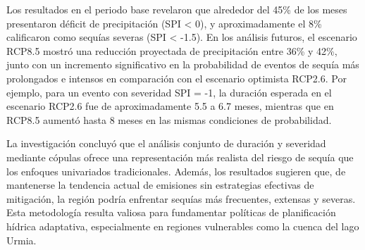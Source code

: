 Los resultados en el periodo base revelaron que alrededor del 45\% de los meses presentaron déficit de precipitación (SPI < 0), y aproximadamente el 8\% calificaron como sequías severas (SPI < -1.5). En los análisis futuros, el escenario RCP8.5 mostró una reducción proyectada de precipitación entre 36\% y 42\%, junto con un incremento significativo en la probabilidad de eventos de sequía más prolongados e intensos en comparación con el escenario optimista RCP2.6. Por ejemplo, para un evento con severidad SPI = -1, la duración esperada en el escenario RCP2.6 fue de aproximadamente 5.5 a 6.7 meses, mientras que en RCP8.5 aumentó hasta 8 meses en las mismas condiciones de probabilidad.

La investigación concluyó que el análisis conjunto de duración y severidad mediante cópulas ofrece una representación más realista del riesgo de sequía que los enfoques univariados tradicionales. Además, los resultados sugieren que, de mantenerse la tendencia actual de emisiones sin estrategias efectivas de mitigación, la región podría enfrentar sequías más frecuentes, extensas y severas. Esta metodología resulta valiosa para fundamentar políticas de planificación hídrica adaptativa, especialmente en regiones vulnerables como la cuenca del lago Urmia.


\begin{center}
    \end{center}


